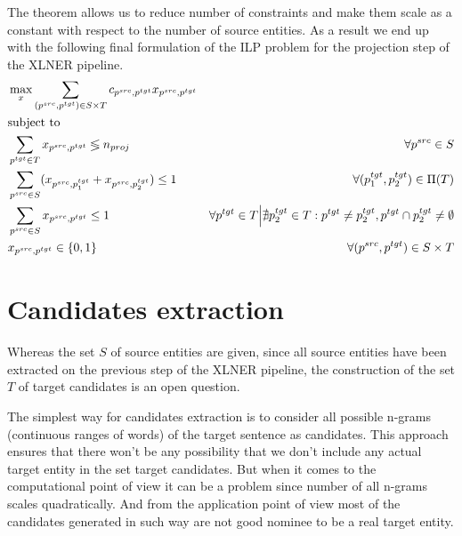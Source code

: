 The theorem allows us to reduce number of constraints and make them scale as a constant
with respect to the number of source entities. As a result we end up with the following final formulation of the ILP problem for the projection step
of the XLNER pipeline.
\begin{equation} \label{eq:ilp}
  \begin{aligned}
    & \max\limits_x \sum\limits_{(p^{src}, p^{tgt}) \in S \times T} c_{p^{src}, p^{tgt}} x_{p^{src}, p^{tgt}}                                                                                                                       \\
    & \text{subject to}                                                                                                                                                                                                             \\
    & \sum\limits_{p^{tgt} \in T} x_{p^{src}, p^{tgt}} \lessgtr n_{proj}                                      & \forall p^{src} \in S                                                                                               \\
    & \sum\limits_{p^{src} \in S} (x_{p^{src}, p_1^{tgt}} + x_{p^{src}, p_2^{tgt}}) \leq 1                    & \forall (p_1^{tgt}, p_2^{tgt}) \in \Pi(T)                                                                           \\
    & \sum\limits_{p^{src} \in S} x_{p^{src}, p^{tgt}} \leq 1                                                 & \forall p^{tgt} \in T \Big| \nexists p_2^{tgt} \in T: p^{tgt} \neq p_2^{tgt}, p^{tgt} \cap p_2^{tgt} \neq \emptyset \\
    & x_{p^{src}, p^{tgt}} \in \{ 0, 1 \}                                                                     & \forall (p^{src}, p^{tgt}) \in S \times T
  \end{aligned}
\end{equation}

\section{Candidates extraction}
Whereas the set \( S \) of source entities are given, since all source entities have been
extracted on the previous step of the XLNER pipeline, the construction of the set \( T \)
of target candidates is an open question.

The simplest way for candidates extraction is to consider all possible n-grams
(continuous ranges of words) of the target sentence as candidates. This approach ensures
that there won't be any possibility that we don't include any actual target entity in the set
target candidates. But when it comes to the computational point of view it can be a problem since
number of all n-grams scales quadratically. And from the application point of view most of
the candidates generated in such way are not good nominee to be a real target entity.

